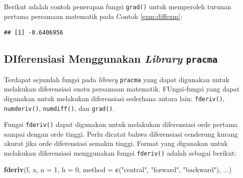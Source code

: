 \documentclass[]{book}
\newenvironment{Shaded}{\begin{snugshade}}{\end{snugshade}}
\newcommand{\ControlFlowTok}[1]{\textcolor[rgb]{0.13,0.29,0.53}{\textbf{#1}}}
\newcommand{\DataTypeTok}[1]{\textcolor[rgb]{0.13,0.29,0.53}{#1}}
\newcommand{\DecValTok}[1]{\textcolor[rgb]{0.00,0.00,0.81}{#1}}
\newcommand{\KeywordTok}[1]{\textcolor[rgb]{0.13,0.29,0.53}{\textbf{#1}}}
\newcommand{\NormalTok}[1]{#1}
\newcommand{\OperatorTok}[1]{\textcolor[rgb]{0.81,0.36,0.00}{\textbf{#1}}}
\newcommand{\StringTok}[1]{\textcolor[rgb]{0.31,0.60,0.02}{#1}}
\theoremstyle{definition}
\theoremstyle{definition}
\theoremstyle{definition}
\theoremstyle{remark}
\begin{document}
Berikut adalah contoh penerapan fungsi \texttt{grad()} untuk memperoleh turunan pertama persamaan matematik pada Contoh \ref{exm:diffexm}:

\begin{Shaded}
\end{Shaded}

\begin{verbatim}
## [1] -0.6406956
\end{verbatim}

\hypertarget{diferensiasi-menggunakan-library-pracma}{%
\subsection{\texorpdfstring{DIferensiasi Menggunakan \emph{Library} \texttt{pracma}}{DIferensiasi Menggunakan Library pracma}}\label{diferensiasi-menggunakan-library-pracma}}

Terdapat sejumlah fungsi pada \emph{library} \texttt{pracma} yang dapat digunakan untuk melakukan diferensiasi suatu persamaan matematik. FUngsi-fungsi yang dapat digunakan untuk melakukan diferensiasi sederhana antara lain: \texttt{fderiv()}, \texttt{numderiv()}, \texttt{numdiff()}, dan \texttt{grad()}.

Fungsi \texttt{fderiv()} dapat digunakan untuk melakukan diferensiasi orde pertama sampai dengan orde tinggi. Perlu dicatat bahwa diferensiasi cenderung kurang akurat jika orde diferensiasi semakin tinggi. Format yang digunakan untuk melakukan diferensiasi menggunakan fungsi \texttt{fderiv()} adalah sebagai berikut:

\begin{Shaded}
\begin{Highlighting}[]
\KeywordTok{fderiv}\NormalTok{(f, x, }\DataTypeTok{n =} \DecValTok{1}\NormalTok{, }\DataTypeTok{h =} \DecValTok{0}\NormalTok{,}
        \DataTypeTok{method =} \KeywordTok{c}\NormalTok{(}\StringTok{"central"}\NormalTok{, }\StringTok{"forward"}\NormalTok{, }\StringTok{"backward"}\NormalTok{), }
\NormalTok{       ...)}
\end{Highlighting}
\end{Shaded}
\end{document}
